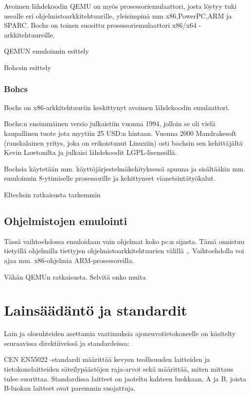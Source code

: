 Avoimen lähdekoodin QEMU on myös prosessoriemulaattori, josta löytyy tuki usealle eri ohjelmistoarkkitehtuurille, yleisimpinä mm x86,PowerPC,ARM ja SPARC. Bochs on toinen suosittu prosessoriemulaattori x86/x64 -arkkitehtuureille.

\lipsum[1-5]

QEMUN emuloinnin esittely

Bohcsin esittely
\subsection{Bohcs}
Bochs on x86-arkkitehtuuriin keskittynyt avoimen lähdekoodin emulaattori.

Bochs:n ensimmäinen versio julkaistiin vuonna 1994, jolloin se oli vielä kaupallinen tuote jota myytiin 25 USD:n hintaan. Vuonna 2000 Mandrakesoft (ranskalainen yritys, joka on erikoistunut Linuxiin) osti bochsin sen kehittäjältä Kevin Lawtonilta ja julkaisi lähdekoodit LGPL-lisenssillä.

Bochsia käytetään mm. käyttöjärjestelmäkehityksessä apuuna ja sisältääkin mm. emuloinnin 8-ytimiselle prosessorille ja kehittyneet vianetsintätyökalut.


Eltechsin ratkaisusta tarkemmin


\section{Ohjelmistojen emulointi}

Tässä vaihtoehdossa emuloidaan vain ohjelmat koko pc:n sijasta. Tämä onnistuu tietyillä ohjelmilla tiettyjen ohjelmistoarkkitehtuurien välillä \cite{tinycc},\cite{qemu_use}. Vaihtoehdolla voi ajaa mm. x86-ohjelmia ARM-prosessoreilla.

Vähän QEMUn ratkaisusta. Selvitä onko muita

\lipsum[1-5]

\newpage

\chapter{Lainsäädäntö ja standardit}

Lain ja olosuhteiden asettamia vaatimuksia ajoneuvotietokoneelle on käsitelty seuraavissa direktiiveissä ja standardeissa:

CEN EN55022 -standardi määrittää kevyen teollisuuden laitteiden ja tietokonelaitteiden säteilypäästöjen raja-arvot sekä määrittää, miten mittaus tulee suorittaa. Standardissa laitteet on jaoteltu kahteen luokkaan, A ja B, joista B-luokan laitteet ovat paremmin suojattuja.\cite{EN55022}

